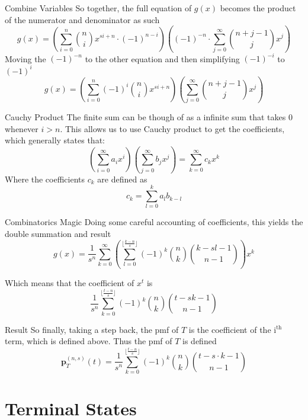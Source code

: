 \documentclass{beamer}
\begin{document}
\begin{frame}{Combine Variables}
    So together, the full equation of $g(x)$ becomes the product of the numerator and denominator as such  
    $$
    g(x) = \left(\sum_{i = 0}^{n} \binom{n}{i} x^{si+n} \cdot (-1)^{n-i} \right) \left((-1)^{-n} \cdot \sum_{j = 0}^{\infty}\binom{n+j-1}{j} x^j \right)
    $$ 
    Moving the $(-1)^{-n}$ to the other equation and then simplifying $(-1)^{-i}$ to $(-1)^i$  
    $$
    g(x) = \left(\sum_{i = 0}^{n} (-1)^i \binom{n}{i} x^{si+n} \right) \left(\sum_{j = 0}^{\infty}\binom{n+j-1}{j} x^j \right)
    $$ 
\end{frame}

\begin{frame}{Cauchy Product}
    The finite sum can be though of as a infinite sum that takes 0 whenever $i > n$. This allows us to use Cauchy product to get the coefficients, which generally states that:
    $$
    \left(\sum_{i=0}^{\infty} a_i x^i \right) \left(\sum_{j=0}^{\infty} b_j x^j \right) = \sum_{k=0}^{\infty} c_k x^k
    $$  
    Where the coefficients $c_k$ are defined as
    $$
    c_k = \sum_{l = 0}^{k} a_l b_{k-l}
    $$
\end{frame}

\begin{frame}{Combinatorics Magic}
    Doing some careful accounting of coefficients, this yields the double summation and result
    $$
    g(x) = \frac{1}{s^n} \sum_{k = 0}^{\infty} \left(\sum_{l = 0}^{\lfloor\frac{k-n}{s} \rfloor} (-1)^k \binom{n}{k} \binom{k-sl-1}{n-1} \right) x^k
    $$
    
    Which means that the coefficient of $x^t$ is 
    $$
    \frac{1}{s^n} \sum_{k = 0}^{\lfloor\frac{t-n}{s} \rfloor} (-1)^k \binom{n}{k} \binom{t-sk-1}{n-1}
    $$ 
\end{frame}

\begin{frame}{Result}
    So finally, taking a step back, the pmf of $T$ is the coefficient of the $\text{i}^{\text{th}}$ term, which is defined above. Thus the pmf  of $T$ is defined
    $$
    \textbf{p}_{T}^{(n, s)}(t) = \frac{1}{s^n} \sum_{k = 0}^{\lfloor\frac{t-n}{s} \rfloor} (-1)^k \binom{n}{k} \binom{t - s \cdot k - 1}{n-1}
    $$
\end{frame}

\section{Terminal States}
\end{document}
